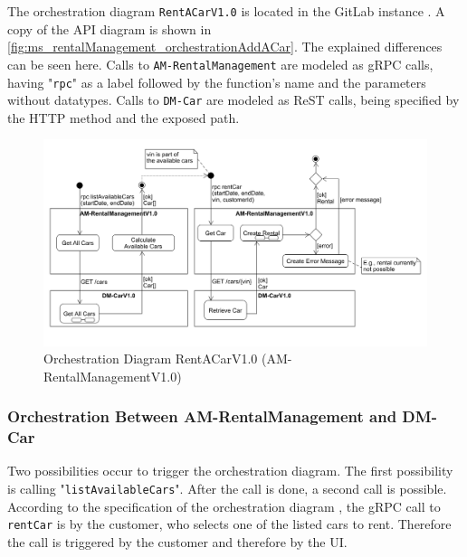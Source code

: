 The orchestration diagram \texttt{RentACarV1.0} is located in the GitLab instance \cite{CM-G-ORC}.
A copy of the API diagram is shown in \autoref{fig:ms_rentalManagement_orchestrationAddACar}.
The explained differences can be seen here.
Calls to \texttt{AM-RentalManagement} are modeled as gRPC calls, having "\texttt{rpc}" as a label followed by the function's name and the parameters without datatypes.
Calls to \texttt{DM-Car} are modeled as ReST calls, being specified by the HTTP method and the exposed path.

\begin{figure}
    \centering
    \includegraphics[width=\textwidth]{figures/microservices/rentalManagement/ms_rentalManagement_orchestrationAddACar.png}
    \caption{Orchestration Diagram RentACarV1.0 (AM-RentalManagementV1.0)}
    \label{fig:ms_rentalManagement_orchestrationAddACar}
\end{figure}

\subsubsection*{Orchestration Between AM-RentalManagement and DM-Car}
Two possibilities occur to trigger the orchestration diagram.
The first possibility is calling "\texttt{listAvailableCars}".
After the call is done, a second call is possible.
According to the specification of the orchestration diagram \cite{CM-G-ORC}, the gRPC call to \texttt{rentCar} is by the customer, who selects one of the listed cars to rent.
Therefore the call is triggered by the customer and therefore by the UI.

